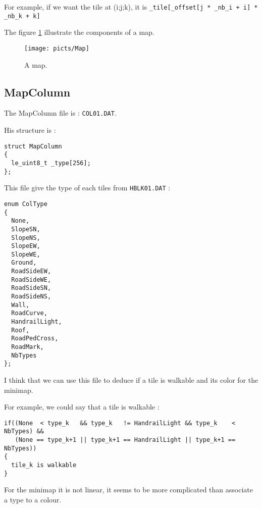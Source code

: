 \documentclass[a4paper,twoside,12pt,dvips]{article}
\begin{document}
For example, if we want the tile at (i;j;k), it is \texttt{\_tile[\_offset[j * \_nb\_i + i] * \_nb\_k + k]}

The figure \ref{fig:mapdata} illustrate the components of a map.

\begin{figure}[htbp]
  \texttt{[image: picts/Map]}\centering 
  \caption{A map.}
  \label{fig:mapdata}
\end{figure}

\subsection{MapColumn}
\label{sec:mapcolumn}

The MapColumn file is : \texttt{COL01.DAT}.

His structure is :

\begin{lstlisting}
struct MapColumn
{
  le_uint8_t _type[256];
};
\end{lstlisting}

This file give the type of each tiles from \texttt{HBLK01.DAT} :
\begin{lstlisting}
enum ColType
{
  None,
  SlopeSN,
  SlopeNS,
  SlopeEW,
  SlopeWE,
  Ground,
  RoadSideEW,
  RoadSideWE,
  RoadSideSN,
  RoadSideNS,
  Wall,
  RoadCurve,
  HandrailLight,
  Roof,
  RoadPedCross,
  RoadMark,
  NbTypes
};
\end{lstlisting}

I think that we can use this file to deduce if a tile is walkable and its color for the minimap.

For example, we could say that a tile is walkable :
\begin{lstlisting}
if((None  < type_k   && type_k   != HandrailLight && type_k    < NbTypes) && 
   (None == type_k+1 || type_k+1 == HandrailLight || type_k+1 == NbTypes)) 
{
  tile_k is walkable
}
\end{lstlisting}

For the minimap it is not linear, it seems to be more complicated than associate a type to a colour.


\end{document}
